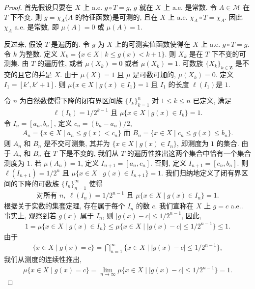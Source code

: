 \documentclass[../../main.tex]{subfiles}
\begin{document}
\begin{proof}
首先假设只要在 $X$ 上 a.e. $g\circ T=g$, $g$ 就在 $X$ 上 a.e. 是常数. 令 $A\in\mathcal{M}$ 在 $T$ 下不变. 则 $g=\chi_{A}$($A$ 的特征函数)是可测的, 且在 $X$ 上 a.e. $\chi_{A}\circ T=\chi_{A}$. 因此 $\chi_{A}$ a.e. 是常数, 即 $\mu(A)=0$ 或 $\mu(A)=1$.

反过来, 假设 $T$ 是遍历的. 令 $g$ 为 $X$ 上的可测实值函数使得在 $X$ 上 a.e. $g\circ T=g$. 令 $k$ 为整数. 定义 $X_{k}=\{x\in X\mid k\leqslant g(x)<k+1\}$. 则 $X_{k}$ 是在 $T$ 下不变的可测集. 由 $T$ 的遍历性, 或者 $\mu(X_{k})=0$ 或者 $\mu(X_{k})=1$. 可数族 $\{X_{k}\}_{k\in\mathbf{Z}}$ 是不交的且它的并是 $X$. 由于 $\mu(X)=1$ 且 $\mu$ 是可数可加的, $\mu(X_{k})=0$. 定义 $I_{1}=[k',k'+1]$. 则 $\mu\{x\in X\mid g(x)\in I_{1}\}=1$ 且 $I_{1}$ 的长度 $\ell(I_{1})$是 $1$.

令 $n$ 为自然数使得下降的闭有界区间族 $\{I_{k}\}_{k=1}^{n}$ 对 $1\leqslant k\leqslant n$ 已定义, 满足
\begin{align*}
\ell(I_{k})=1/2^{k-1}\text{ 且 }\mu\{x\in X\mid g(x)\in I_{k}\}=1.
\end{align*}
令 $I_{n}=[a_{n},b_{n}]$, 定义 $c_{n}=(b_{n}-a_{n})/2$,
\begin{align*}
A_{n}=\{x\in X\mid a_{n}\leqslant g(x)<c_{n}\}\text{ 而 }B_{n}=\{x\in X\mid c_{n}\leqslant g(x)\leqslant b_{n}\}.
\end{align*}
则 $A_{n}$ 和 $B_{n}$ 是不交可测集, 其并为 $\{x\in X\mid g(x)\in I_{n}\}$, 即测度为 $1$ 的集合. 由于 $A_{n}$ 和 $B_{n}$ 在 $T$ 下是不变的, 我们从 $T$ 的遍历性推出这两个集合中恰有一个集合测度为 $1$. 若 $\mu(A_{n})=1$, 定义 $I_{n+1}=[a_{n},c_{n}]$. 否则, 定义 $I_{n+1}=[c_{n},b_{n}]$. 则 $\ell(I_{n+1})=1/2^{n}$ 且 $\mu\{x\in X\mid g(x)\in I_{n+1}\}=1$. 我们归纳地定义了闭有界区间的下降的可数族 $\{I_{n}\}_{n=1}^{\infty}$ 使得
\begin{align*}
\text{对所有 }n,\ \ell(I_{n})=1/2^{n-1}\text{ 且 }\mu\{x\in X\mid g(x)\in I_{n}\}=1.
\end{align*}
根据关于实数的集套定理, 存在属于每个 $I_{n}$ 的数 $c$. 我们宣称在 $X$ 上 $g=c$ a.e.. 事实上, 观察到若 $g(x)$ 属于 $I_{n}$, 则 $|g(x)-c|\leqslant 1/2^{n-1}$, 因此,
\begin{align*}
1=\mu\{x\in X\mid g(x)\in I_{n}\}\leqslant\mu\{x\in X\mid|g(x)-c|\leqslant 1/2^{n-1}\}\leqslant 1.
\end{align*}
由于
\begin{align*}
\{x\in X\mid g(x)=c\}=\bigcap_{n=1}^{\infty}\{x\in X\mid|g(x)-c|\leqslant 1/2^{n-1}\},
\end{align*}
我们从测度的连续性推出,
\begin{align*}
\mu\{x\in X\mid g(x)=c\}=\lim_{n\to\infty}\mu\{x\in X\mid|g(x)-c|\leqslant 1/2^{n-1}\}=1.
\end{align*}
\end{proof}
\end{document}

